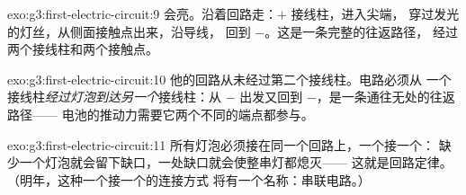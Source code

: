 \begin{solution}{exo:g3:first-electric-circuit:9}
会亮。沿着回路走：$+$ 接线柱，进入尖端，
穿过发光的灯丝，从侧面接触点出来，沿导线，
回到 $-$。这是一条完整的往返路径，
经过两个接线柱和两个接触点。
\end{solution}

\begin{solution}{exo:g3:first-electric-circuit:10}
他的回路从未经过第二个接线柱。电路必须从
一个接线柱\emph{经过灯泡到达另一个}接线柱：从
$-$ 出发又回到 $-$，是一条通往无处的往返路径——
电池的推动力需要它两个不同的端点都参与。
\end{solution}

\begin{solution}{exo:g3:first-electric-circuit:11}
所有灯泡必须接在同一个回路上，一个接一个：
缺少一个灯泡就会留下缺口，一处缺口就会使整串灯都熄灭——
这就是回路定律。（明年，这种一个接一个的连接方式
将有一个名称：串联电路。）
\end{solution}
